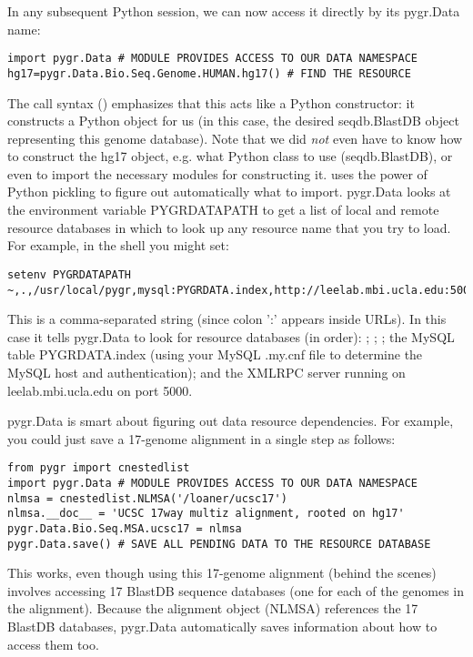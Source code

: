 \documentclass{howto}
\begin{document}
In any subsequent Python session, we can now access it directly by its
pygr.Data name:
\begin{verbatim}
import pygr.Data # MODULE PROVIDES ACCESS TO OUR DATA NAMESPACE
hg17=pygr.Data.Bio.Seq.Genome.HUMAN.hg17() # FIND THE RESOURCE
\end{verbatim}
The call syntax () emphasizes that this acts like a Python
constructor: it constructs a Python object for us (in this case, the
desired seqdb.BlastDB object representing this genome database).
Note that we did {\em not} even have to know how to construct the hg17 
object, e.g. what Python class to use (seqdb.BlastDB), or even to import
the necessary modules for constructing it.   uses the
power of Python pickling to figure out automatically what to import.
pygr.Data looks at the environment variable PYGRDATAPATH to get a list 
of local and remote resource databases in which to look up any resource name
that you try to load.  For example, in the shell you might set:
\begin{verbatim}
setenv PYGRDATAPATH ~,.,/usr/local/pygr,mysql:PYGRDATA.index,http://leelab.mbi.ucla.edu:5000
\end{verbatim}
This is a comma-separated string (since colon ':' appears inside URLs).
In this case it tells pygr.Data to look for resource databases (in order):
; ; ;
the MySQL table PYGRDATA.index (using your
MySQL .my.cnf file to determine the MySQL host and authentication);
and the XMLRPC server running on leelab.mbi.ucla.edu on port 5000.

pygr.Data is smart about figuring out data resource dependencies.
For example, you could just save a 17-genome alignment in a single step
as follows:
\begin{verbatim}
from pygr import cnestedlist
import pygr.Data # MODULE PROVIDES ACCESS TO OUR DATA NAMESPACE
nlmsa = cnestedlist.NLMSA('/loaner/ucsc17')
nlmsa.__doc__ = 'UCSC 17way multiz alignment, rooted on hg17'
pygr.Data.Bio.Seq.MSA.ucsc17 = nlmsa
pygr.Data.save() # SAVE ALL PENDING DATA TO THE RESOURCE DATABASE
\end{verbatim}
This works, even though using this 17-genome alignment (behind the
scenes) involves accessing 17 BlastDB sequence databases (one for each
of the genomes in the alignment).  Because the alignment object (NLMSA)
references the 17 BlastDB databases, pygr.Data automatically saves information
about how to access them too.
\end{document}
